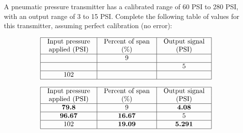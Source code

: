 

A pneumatic pressure transmitter has a calibrated range of 60 PSI to 280 PSI, with an output range of 3 to 15 PSI.  Complete the following table of values for this transmitter, assuming perfect calibration (no error):


$$\vbox{\offinterlineskip
\halign{\strut
\vrule \quad\hfil # \ \hfil & 
\vrule \quad\hfil # \ \hfil & 
\vrule \quad\hfil # \ \hfil \vrule \cr
\noalign{\hrule}
%
Input pressure & Percent of span & Output signal \cr
%
applied (PSI) & (\%) & (PSI) \cr
%
\noalign{\hrule}
%
 & 9 &  \cr
%
\noalign{\hrule}
%
 &  & 5 \cr
%
\noalign{\hrule}
%
102 &  &  \cr
%
\noalign{\hrule}
} %
}$$ %









$$\vbox{\offinterlineskip
\halign{\strut
\vrule \quad\hfil # \ \hfil & 
\vrule \quad\hfil # \ \hfil & 
\vrule \quad\hfil # \ \hfil \vrule \cr
\noalign{\hrule}
%
Input pressure & Percent of span & Output signal \cr
%
applied (PSI) & (\%) & (PSI) \cr
%
\noalign{\hrule}
%
{\bf 79.8} & 9 & {\bf 4.08} \cr
%
\noalign{\hrule}
%
{\bf 96.67} & {\bf 16.67} & 5 \cr
%
\noalign{\hrule}
%
102 & {\bf 19.09} & {\bf 5.291} \cr
%
\noalign{\hrule}
} %
}$$ %









